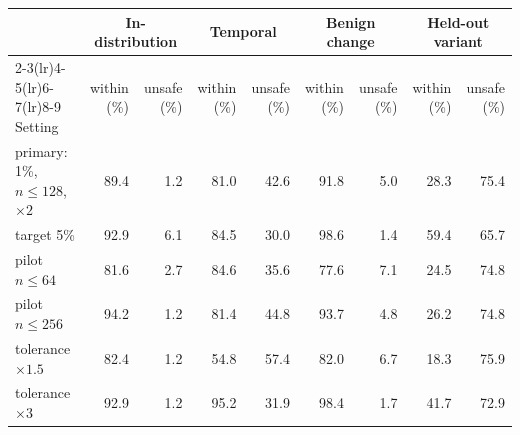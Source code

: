 \begin{tabular}{lrrrrrrrr}
\toprule
 & \multicolumn{2}{c}{In-distribution} & \multicolumn{2}{c}{Temporal} & \multicolumn{2}{c}{Benign change} & \multicolumn{2}{c}{Held-out variant} \\
\cmidrule(lr){2-3}\cmidrule(lr){4-5}\cmidrule(lr){6-7}\cmidrule(lr){8-9}
Setting & within (\%) & unsafe (\%) & within (\%) & unsafe (\%) & within (\%) & unsafe (\%) & within (\%) & unsafe (\%) \\
\midrule
primary: 1\%, $n\le128$, $\times2$ & 89.4 & 1.2 & 81.0 & 42.6 & 91.8 & 5.0 & 28.3 & 75.4 \\
target 5\% & 92.9 & 6.1 & 84.5 & 30.0 & 98.6 & 1.4 & 59.4 & 65.7 \\
pilot $n\le64$ & 81.6 & 2.7 & 84.6 & 35.6 & 77.6 & 7.1 & 24.5 & 74.8 \\
pilot $n\le256$ & 94.2 & 1.2 & 81.4 & 44.8 & 93.7 & 4.8 & 26.2 & 74.8 \\
tolerance $\times1.5$ & 82.4 & 1.2 & 54.8 & 57.4 & 82.0 & 6.7 & 18.3 & 75.9 \\
tolerance $\times3$ & 92.9 & 1.2 & 95.2 & 31.9 & 98.4 & 1.7 & 41.7 & 72.9 \\
\bottomrule
\end{tabular}
